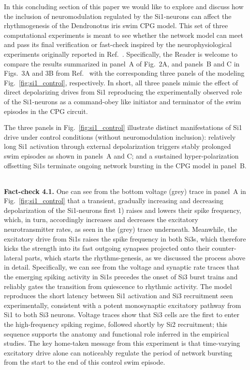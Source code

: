 \documentclass[nofootinbib,aip,amsmath,amssymb,reprint,twocolumn,10pt]{revtex4-2}
\begin{document}
In this concluding section of this paper we would like to explore and discuss how the inclusion of 
neuromodulation regulated by the Si1-neurons can affect the rhythmogenesis of the {Dendronotus iris} 
swim CPG model. This set of three computational experiments is meant to see whether the network model can meet and pass its final verification or fast-check inspired by the neurophysiological experiments originally reported in Ref.~\cite{sakurai2019command}. Specifically, the Reader is welcome to compare the results summarized in panel~A of Fig.~2A, and panels~B and C in Figs.~3A and 3B from Ref.~\cite{sakurai2019command} with the  corresponding three panels of the modeling Fig.~\ref{fig:si1_control}, respectively.  In short, all three panels mimic the effect of direct depolarizing drives from Si1 reproducing the experimentally observed role of the Si1-neurons as a command-obey like initiator and terminator of the swim episodes in the CPG circuit. 

The three panels in Fig.~\ref{fig:si1_control} illustrate distinct manifestations of Si1 drive under control conditions (without neuromodulation inclusion): relatively long Si1 activation through external depolarization  triggers stably prolonged swim episodes  as shown in panels~A and C; and a sustained hyper-polarization offsetting Si1s terminate ongoing network bursting in the CPG model in panel~B.

~\\
{\bf Fact-check 4.1.} One can see from the bottom voltage (grey) trace in panel~A in Fig.~\ref{fig:si1_control} that a transient, gradually increasing and decreasing depolarization of the Si1-neurons first 1) raises and lowers their spike frequency, which, in turn, accordingly increases and decreases the excitatory neurotransmitter rates, as seen in the (grey) trace underneath. Meanwhile, the excitatory drive from Si1s raises the spike frequency in both Si3s, which therefore kicks the strength into  its fast outgoing synapses projected onto their counter-lateral parts, which starts the rhythms-genesis, as we discussed the process above in detail. Specifically, we can see from the voltage and synaptic rate traces that the emerging spiking activity in Si1s precedes the onset of Si3 burst trains and reliably gates the transition from quiescence to rhythmic activity. The model reproduces the short latency between Si1 activation and Si3 recruitment seen experimentally, consistent with a potent monosynaptic excitatory pathway from Si1 to both Si3 neurons. Voltage traces show that Si3 cells are the first to enter the high-frequency spiking regime, followed shortly by Si2 recruitment; this sequence supports the anatomy and functional role inferred in the empirical studies. The key home-taken message from this experiment is that time-varying excitatory drive alone can noticeably regulate the period of network bursting from the start to the end of this control swim episode.
\end{document}
